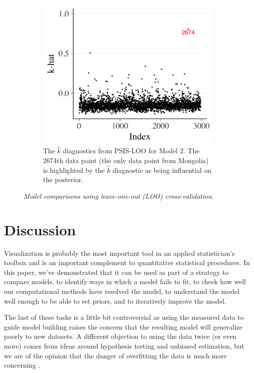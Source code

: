 \documentclass{statsoc}
\begin{document}
\begin{figure}
\begin{subfigure}{0.48\textwidth}
\includegraphics[width=\textwidth]{loo_khat.png}
\caption{The $\hat{k}$ diagnostics from PSIS-LOO for Model 2. The 2674th data
point (the only data point from Mongolia) is highlighted by the $\hat{k}$
diagnostic as being influential on the posterior.}
\label{fig:loo_khat}
\end{subfigure}
\caption{\it Model comparisons using leave-one-out (LOO) cross-validation.}
\end{figure}



\section{Discussion}

Visualization is probably the most important tool in an applied statistician's
toolbox and is an important complement to quantitative statistical procedures.
In this paper, we've demonstrated that it can be used as part of a strategy to
compare models, to identify ways in which a model fails to fit, to check how
well our computational methods have resolved the model, to understand the model
well enough to be able to set priors, and to iteratively improve the model.

The last of these tasks is a little bit controversial as using the measured data
to guide model building raises the concern that the resulting model will
generalize poorly to new datasets. A different objection to using the data twice
(or even more) comes from ideas around hypothesis testing and unbiased
estimation, but we are of the opinion that the danger of overfitting the data is
much more concerning \citep{gelman2014statistical}.
\end{document}
